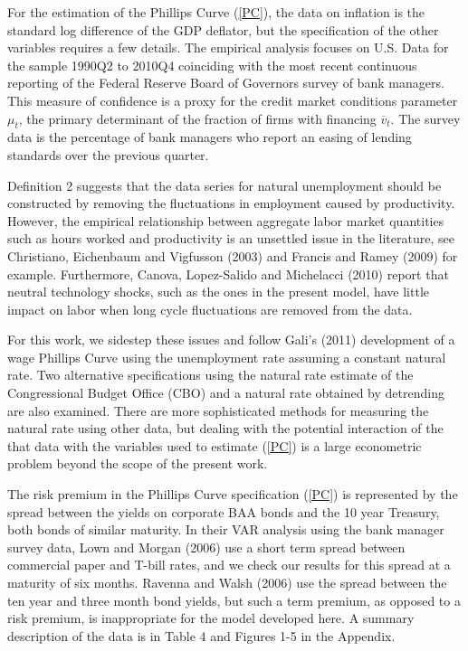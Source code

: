 \documentclass{article}
\begin{document}
For the estimation of the Phillips Curve (\ref{PC}), the data on inflation
is the standard log difference of the GDP deflator, but the specification of
the other variables requires a few details. The empirical analysis
focuses on U.S. Data for the sample 1990Q2 to 2010Q4 coinciding with the
most recent continuous reporting of the Federal Reserve Board of Governors
survey of bank managers. This measure of confidence is a proxy for the
credit market conditions parameter $\mu _{t}$, the primary determinant of
the fraction of firms with financing $\overline{v}_{t}.$ The survey data
is the percentage of bank managers who report an easing of lending standards
over the previous quarter.

Definition 2 suggests that the data series for natural unemployment should
be constructed by removing the fluctuations in employment caused by
productivity. However, the empirical relationship between aggregate labor
market quantities such as hours worked and productivity is an unsettled
issue in the literature, see Christiano, Eichenbaum and Vigfusson (2003) and
Francis and Ramey (2009) for example. Furthermore, Canova, Lopez-Salido
and Michelacci (2010) report that neutral technology shocks, such as the
ones in the present model, have little impact on labor when long cycle
fluctuations are removed from the data.

For this work, we sidestep these issues and follow Gali's (2011) development
of a wage Phillips Curve using the unemployment rate
assuming a constant natural rate. Two alternative specifications using the
natural rate estimate of the Congressional Budget Office (CBO) and a natural
rate obtained by detrending are also examined. There are more
sophisticated methods for measuring the natural rate using other data, but
dealing with the potential interaction of the that data with the variables
used to estimate (\ref{PC}) is a large econometric problem beyond the scope
of the present work.

The risk premium in the Phillips Curve specification (\ref{PC}) is
represented by the spread between the yields on corporate BAA bonds and the
10 year Treasury, both bonds of similar maturity. In their VAR analysis
using the bank manager survey data, Lown and Morgan (2006) use a short term
spread between commercial paper and T-bill rates, and we check our results
for this spread at a maturity of six months. Ravenna and Walsh (2006) use
the spread between the ten year and three month bond yields, but such a term
premium, as opposed to a risk premium, is inappropriate for the model
developed here. A summary description of the data is in Table 4 and
Figures 1-5 in the Appendix.
\end{document}
